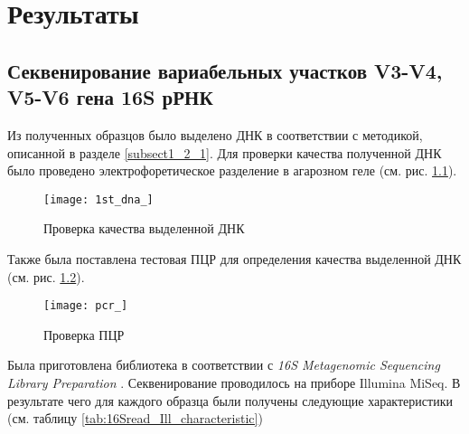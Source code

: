 \chapter{Результаты} \label{chapt2}

\section{Секвенирование вариабельных участков V3-V4, V5-V6 гена 16S рРНК} \label{sect2_1}


Из полученных образцов было выделено ДНК в соответствии с методикой, описанной в разделе \ref{subsect1_2_1}. Для проверки качества полученной ДНК было проведено электрофоретическое разделение в агарозном геле (см. рис. \ref{img:1st_dna}). 

\begin{figure}[h]
  \texttt{[image: 1st\_dna\_]}
  \centering
  \caption{Проверка качества выделенной ДНК}
  \label{img:1st_dna}  
\end{figure}

Также была поставлена тестовая ПЦР для определения качества выделенной ДНК (см. рис. \ref{img:pcr}). 

\begin{figure}[h]
  \texttt{[image: pcr\_]}
  \centering
  \caption{Проверка ПЦР}
  \label{img:pcr}  
\end{figure}

Была приготовлена библиотека в соответствии с \textit{16S Metagenomic Sequencing Library Preparation }. Секвенирование проводилось на приборе Illumina MiSeq. В результате чего для каждого образца были получены следующие характеристики (см. таблицу \ref{tab:16Sread_Ill_characteristic})


